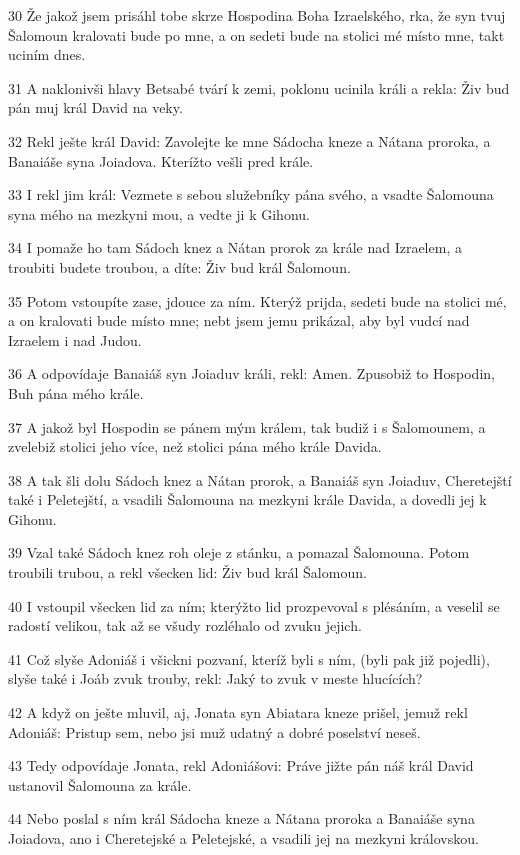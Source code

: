 \par 30 Že jakož jsem prisáhl tobe skrze Hospodina Boha Izraelského, rka, že syn tvuj Šalomoun kralovati bude po mne, a on sedeti bude na stolici mé místo mne, takt uciním dnes.
\par 31 A naklonivši hlavy Betsabé tvárí k zemi, poklonu ucinila králi a rekla: Živ bud pán muj král David na veky.
\par 32 Rekl ješte král David: Zavolejte ke mne Sádocha kneze a Nátana proroka, a Banaiáše syna Joiadova. Kterížto vešli pred krále.
\par 33 I rekl jim král: Vezmete s sebou služebníky pána svého, a vsadte Šalomouna syna mého na mezkyni mou, a vedte ji k Gihonu.
\par 34 I pomaže ho tam Sádoch knez a Nátan prorok za krále nad Izraelem, a troubiti budete troubou, a díte: Živ bud král Šalomoun.
\par 35 Potom vstoupíte zase, jdouce za ním. Kterýž prijda, sedeti bude na stolici mé, a on kralovati bude místo mne; nebt jsem jemu prikázal, aby byl vudcí nad Izraelem i nad Judou.
\par 36 A odpovídaje Banaiáš syn Joiaduv králi, rekl: Amen. Zpusobiž to Hospodin, Buh pána mého krále.
\par 37 A jakož byl Hospodin se pánem mým králem, tak budiž i s Šalomounem, a zvelebiž stolici jeho více, než stolici pána mého krále Davida.
\par 38 A tak šli dolu Sádoch knez a Nátan prorok, a Banaiáš syn Joiaduv, Cheretejští také i Peletejští, a vsadili Šalomouna na mezkyni krále Davida, a dovedli jej k Gihonu.
\par 39 Vzal také Sádoch knez roh oleje z stánku, a pomazal Šalomouna. Potom troubili trubou, a rekl všecken lid: Živ bud král Šalomoun.
\par 40 I vstoupil všecken lid za ním; kterýžto lid prozpevoval s plésáním, a veselil se radostí velikou, tak až se všudy rozléhalo od zvuku jejich.
\par 41 Což slyše Adoniáš i všickni pozvaní, kteríž byli s ním, (byli pak již pojedli), slyše také i Joáb zvuk trouby, rekl: Jaký to zvuk v meste hlucících?
\par 42 A když on ješte mluvil, aj, Jonata syn Abiatara kneze prišel, jemuž rekl Adoniáš: Pristup sem, nebo jsi muž udatný a dobré poselství neseš.
\par 43 Tedy odpovídaje Jonata, rekl Adoniášovi: Práve jižte pán náš král David ustanovil Šalomouna za krále.
\par 44 Nebo poslal s ním král Sádocha kneze a Nátana proroka a Banaiáše syna Joiadova, ano i Cheretejské a Peletejské, a vsadili jej na mezkyni královskou.
